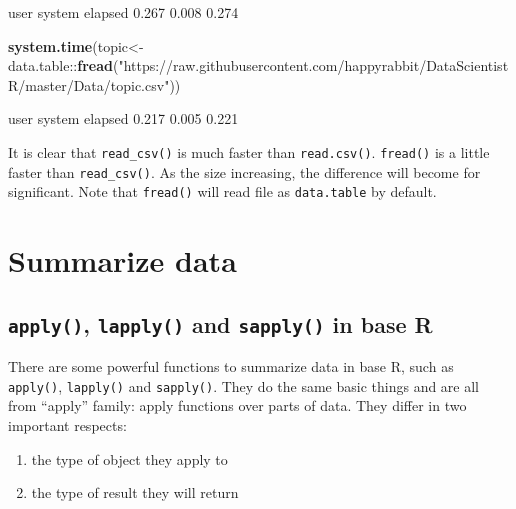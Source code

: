 \documentclass[]{book}
\newenvironment{Shaded}{\begin{snugshade}}{\end{snugshade}}
\newcommand{\KeywordTok}[1]{\textcolor[rgb]{0.13,0.29,0.53}{\textbf{{#1}}}}
\newcommand{\StringTok}[1]{\textcolor[rgb]{0.31,0.60,0.02}{{#1}}}
\newcommand{\NormalTok}[1]{{#1}}
\providecommand{\tightlist}{%
  \setlength{\itemsep}{0pt}\setlength{\parskip}{0pt}}
\theoremstyle{definition}
\theoremstyle{definition}
\theoremstyle{remark}
\begin{document}
\begin{Shaded}
\begin{Highlighting}[]
   \NormalTok{user  system elapsed }
  \NormalTok{0.267   0.008   0.274 }
\end{Highlighting}
\end{Shaded}

\begin{Shaded}
\begin{Highlighting}[]
\KeywordTok{system.time}\NormalTok{(topic<-data.table::}\KeywordTok{fread}\NormalTok{(}\StringTok{"https://raw.githubusercontent.com/happyrabbit/DataScientistR/master/Data/topic.csv"}\NormalTok{))}
\end{Highlighting}
\end{Shaded}

\begin{Shaded}
\begin{Highlighting}[]
   \NormalTok{user  system elapsed }
  \NormalTok{0.217   0.005   0.221 }
\end{Highlighting}
\end{Shaded}

It is clear that \texttt{read\_csv()} is much faster than
\texttt{read.csv()}. \texttt{fread()} is a little faster than
\texttt{read\_csv()}. As the size increasing, the difference will become
for significant. Note that \texttt{fread()} will read file as
\texttt{data.table} by default.

\section{Summarize data}\label{summarize-data}

\subsection{\texorpdfstring{\texttt{apply()}, \texttt{lapply()} and
\texttt{sapply()} in base
R}{apply(), lapply() and sapply() in base R}}\label{apply-lapply-and-sapply-in-base-r}

There are some powerful functions to summarize data in base R, such as
\texttt{apply()}, \texttt{lapply()} and \texttt{sapply()}. They do the
same basic things and are all from ``apply'' family: apply functions
over parts of data. They differ in two important respects:

\begin{enumerate}
\def\labelenumi{\arabic{enumi}.}
\tightlist
\item
  the type of object they apply to
\item
  the type of result they will return
\end{enumerate}
\end{document}
